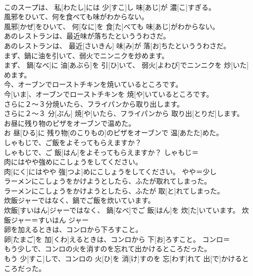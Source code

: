 \documentclass[8pt]{extreport}
\begin{document}
\begin{CJK}{UTF8}{min}
\\	このスープは、 私[わたし]には 少[すこ]し 味[あじ]が 濃[こ]すぎる。	
\\	風邪をひいて、何を食べても味がわからない。	
\\	風邪[かぜ]をひいて、 何[なに]を 食[た]べても 味[あじ]がわからない。	
\\	あのレストランは、最近味が落ちたといううわさだ。	
\\	あのレストランは、 最近[さいきん] 味[み]が 落[お]ちたといううわさだ。	
\\	まず、鍋に油を引いて、弱火でニンニクを炒めます。	
\\	まず、 鍋[なべ]に 油[あぶら]を 引[ひ]いて、 弱火[よわび]でニンニクを 炒[いた]めます。	
\\	今、オーブンでローストチキンを焼いているところです。	
\\	今[いま]、オーブンでローストチキンを 焼[や]いているところです。	
\\	さらに２〜３分焼いたら、フライパンから取り出します。	
\\	さらに２〜３ 分[ぷん] 焼[や]いたら、フライパンから 取り出[とりだ]します。	
\\	お昼に残り物のピザをオーブンで温めた。	
\\	お 昼[ひる]に 残り物[のこりもの]のピザをオーブンで 温[あたた]めた。	
\\	しゃもじで、ご飯をよそってもらえますか？	
\\	しゃもじで、ご 飯[はん]をよそってもらえますか？	しゃもじ＝ 
\\	肉にはやや強めにこしょうをしてください。	
\\	肉[にく]にはやや 強[つよ]めにこしょうをしてください。	やや＝少し
\\	ラーメンにこしょうをかけようとしたら、ふたが取れてしまった。	
\\	ラーメンにこしょうをかけようとしたら、ふたが 取[と]れてしまった。	
\\	炊飯ジャーではなく、鍋でご飯を炊いています。	
\\	炊飯[すいはん]ジャーではなく、 鍋[なべ]でご 飯[はん]を 炊[た]いています。	炊飯ジャー＝すいはん ジャー 
\\	卵を加えるときは、コンロから下ろすこと。	
\\	卵[たまご]を 加[くわ]えるときは、コンロから 下[お]ろすこと。	コンロ＝ 
\\	もう少しで、コンロの火を消すのを忘れて出かけるところだった。	
\\	もう 少[すこ]しで、コンロの 火[ひ]を 消[け]すのを 忘[わす]れて 出[で]かけるところだった。	

\end{CJK}
\end{document}
